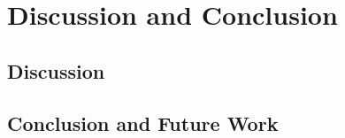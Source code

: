 \chapter{Discussion and Conclusion}
\label{chapter:discussion}


\section{Discussion}
\section{Conclusion and Future Work}

